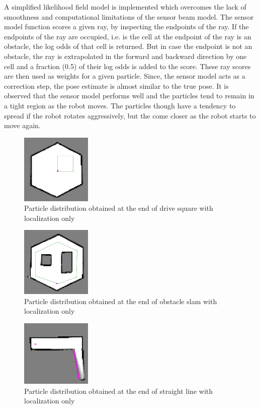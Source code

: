 \documentclass[journal,onecolumn]{IEEEtran}
\begin{document}
A simplified likelihood field model is implemented which overcomes the lack of smoothness and computational limitations of the sensor beam model. The sensor model function scores a given ray, by inspecting the endpoints of the ray. If the endpoints of the ray are occupied, i.e. is the cell at the endpoint of the ray is an obstacle, the log odds of that cell is returned. But in case the endpoint is not an obstacle, the ray is extrapolated in the forward and backward direction by one cell and a fraction (0.5) of their log odds is added to the score. These ray scores are then used as weights for a given particle. Since, the sensor model acts as a correction step, the pose estimate is almost similar to the true pose. It is observed that the sensor model performs well and the particles tend to remain in a tight region as the robot moves. The particles though have a tendency to spread if the robot rotates aggressively, but the come closer as the robot starts to move again.


\begin{figure}[H]
\centering
\includegraphics[width=0.3\textwidth]{Media/1221.png}
\caption{Particle distribution obtained at the end of drive square with localization only}
\end{figure}

\begin{figure}[H]
\centering
\includegraphics[width=0.3\textwidth]{Media/1222.png}
\caption{Particle distribution obtained at the end of obstacle slam with localization only}
\end{figure}


\begin{figure}[H]
\centering
\includegraphics[width=0.3\textwidth]{Media/1223.png}
\caption{Particle distribution obtained at the end of straight line with localization only}
\end{figure}
\end{document}
